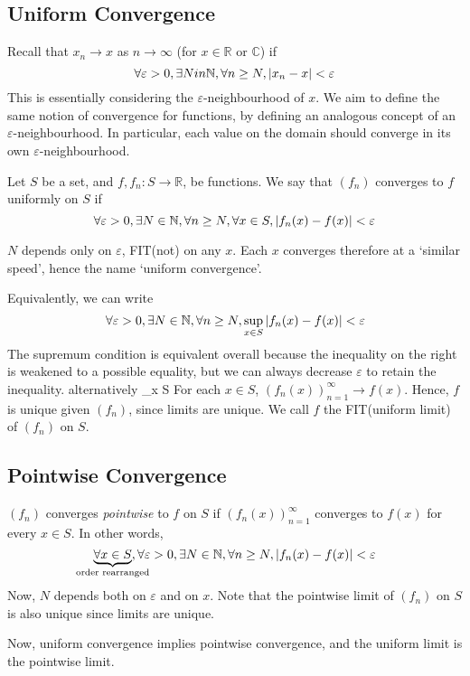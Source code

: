 \subsection{Uniform Convergence}
Recall that \( x_n \to x \) as \( n \to \infty \) (for \( x \in \mathbb R\) or \(\mathbb C\)) if
\[ \forall \varepsilon > 0, \exists N in \mathbb N, \forall n \geq N, \abs{x_n-x} < \varepsilon \]
This is essentially considering the \( \varepsilon \)-neighbourhood of \( x \).
We aim to define the same notion of convergence for functions, by defining an analogous concept of an \( \varepsilon \)-neighbourhood.
In particular, each value on the domain should converge in its own \( \varepsilon \)-neighbourhood.
\begin{definition}
Let \( S \) be a set, and \( f, f_n \colon S \to \mathbb R \), be functions.
We say that \( (f_n) \) converges to \( f \) uniformly on \( S \) if
\[ \forall \varepsilon > 0, \exists N \in \mathbb N, \forall n \geq N, \forall x \in S, \abs{f_n(x) - f(x)} < \varepsilon \]
\begin{note}
\( N \) depends only on \( \varepsilon \), FIT(not) on any \( x \).
Each \( x \) converges therefore at a `similar speed', hence the name `uniform convergence'.
\end{note}
Equivalently, we can write
\[ \forall \varepsilon > 0, \exists N \in \mathbb N, \forall n \geq N, \sup_{x \in S} \abs{f_n(x) - f(x)} < \varepsilon \]
The supremum condition is equivalent overall because the inequality on the right is weakened to a possible equality, but we can always decrease \( \varepsilon \) to retain the inequality.
alternatively \sup_{x \in S}  
For each \( x \in S \), \( (f_n(x))_{n=1}^\infty \to f(x) \).
Hence, \( f \) is unique given \( (f_n) \), since limits are unique.
We call \( f \) the FIT(uniform limit) of \( (f_n) \) on \( S \).

\subsection{Pointwise Convergence}
\begin{definition}
\( (f_n) \) converges \textit{pointwise} to \( f \) on \( S \) if \( (f_n(x))_{n=1}^\infty \) converges to \( f(x) \) for every \( x \in S \).
In other words,
\[ \underbrace{\forall x \in S}_{\mathclap{\text{order rearranged}}}, \forall \varepsilon > 0, \exists N \in \mathbb N, \forall n \geq N, \abs{f_n(x) - f(x)} < \varepsilon \]
Now, \( N \) depends both on \( \varepsilon \) and on \( x \).
Note that the pointwise limit of \( (f_n) \) on \( S \) is also unique since limits are unique.
\end{definition}
Now, uniform convergence implies pointwise convergence, and the uniform limit is the pointwise limit.


\end{definition}
